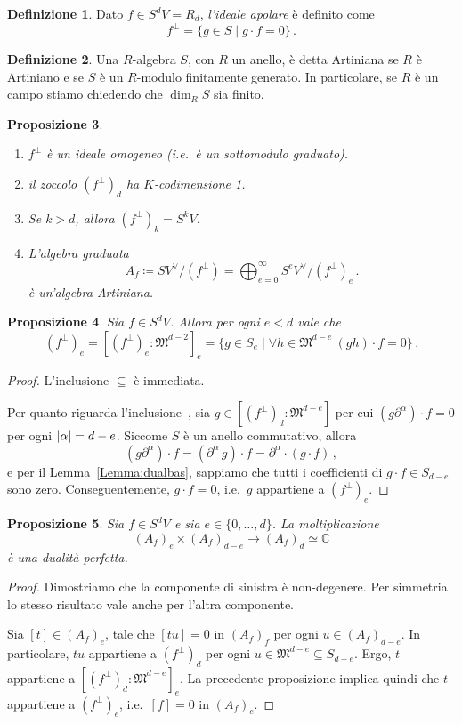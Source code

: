 \documentclass[a4paper, 11pt]{article}
\theoremstyle{definition}
\newtheorem{Def}{Definizione}[section]
\theoremstyle{plain}
\newtheorem{Prop}[Def]{Proposizione}
\DeclarePairedDelimiter{\abs}{\lvert}{\rvert}
\newcommand{\C}{\mathbb{C}}
\newcommand{\MM}{\mathfrak{M}}
\newcommand{\deff}{\coloneqq}
\begin{document}
\begin{Def}
	Dato $f \in S^d V = R_d$, \emph{l'ideale apolare} è definito come
	\[
		f^\bot = \{g \in S \mid g\cdot f = 0\}\,.
	\]
\end{Def}
\begin{Def}
	Una $R$-algebra $S$, con $R$ un anello, è detta Artiniana se $R$ è Artiniano e se $S$ è un $R$-modulo finitamente generato. In particolare, se $R$ è un campo stiamo chiedendo che $\dim_R S$ sia finito.
\end{Def}
\begin{Prop}
	\begin{enumerate}
		\item $f^\bot$ è un ideale omogeneo (i.e.\ è un sottomodulo graduato).
		\item il \emph{zoccolo} $(f^\bot)_d$ ha $K$-codimensione 1.
		\item Se $k > d$, allora $(f^\bot)_k = S^k V$.
		\item L'algebra graduata
		\[
			A_f \deff SV^\vee/(f^\bot) = \bigoplus_{e = 0}^\infty S^eV^\vee/(f^\bot)_e\,.
		\]
		è un'algebra Artiniana.
	\end{enumerate}
\end{Prop}
\begin{Prop}
	Sia $f \in S^d V$. Allora per ogni $e < d$ vale che
	\[
		(f^\bot)_e = [(f^\bot)_e \colon \MM^{d-2}]_e = \{g \in S_e \mid \forall h \in \MM^{d-e}\ (gh)\cdot f = 0\}\,.
	\]
\end{Prop}
\begin{proof}
	L'inclusione $\boxed{\subseteq}$ è immediata.
	
	Per quanto riguarda l'inclusione \boxed{\supseteq}\,, sia $g \in [(f^\bot)_d \colon \MM^{d-e}]$ per cui $(g\partial^\alpha) \cdot f = 0$ per ogni $\abs{\alpha} = d-e$. Siccome $S$ è un anello commutativo, allora
	\[
	(g\partial^\alpha)\cdot f = (\partial^\alpha\,g)\cdot f =  \partial^\alpha\cdot(g\cdot f)\,,
	\]
	e per il Lemma~\ref{Lemma:dualbas}, sappiamo che tutti i coefficienti di $g \cdot f \in S_{d-e}$ sono zero. Conseguentemente, $g \cdot f = 0$, i.e.\ $g$ appartiene a $(f^\bot)_e$.
\end{proof}
\begin{Prop}
	Sia $f \in S^d V$ e sia $e \in \{0,\dots, d\}$. La moltiplicazione 
	\[
		(A_f)_e \times (A_f)_{d-e} \to (A_f)_d \simeq \C
	\]
	è una dualità perfetta.
\end{Prop}
\begin{proof}
	Dimostriamo che la componente di sinistra è non-degenere. Per simmetria lo stesso risultato vale anche per l'altra componente.
	
	Sia $[t] \in (A_f)_e$, tale che $[tu] = 0$ in $(A_f)_f$ per ogni $u \in (A_f)_{d-e}$. In particolare, $tu$ appartiene a $(f^\bot)_d$ per ogni $u \in \MM^{d-e} \subseteq S_{d-e}$. Ergo, $t$ appartiene a $[(f^\bot)_d \colon \MM^{d-e}]_e$. La precedente proposizione implica quindi che $t$ appartiene a $(f^\bot)_e$, i.e.\ $[f] = 0$ in $(A_f)_e$.
\end{proof}
\end{document}
